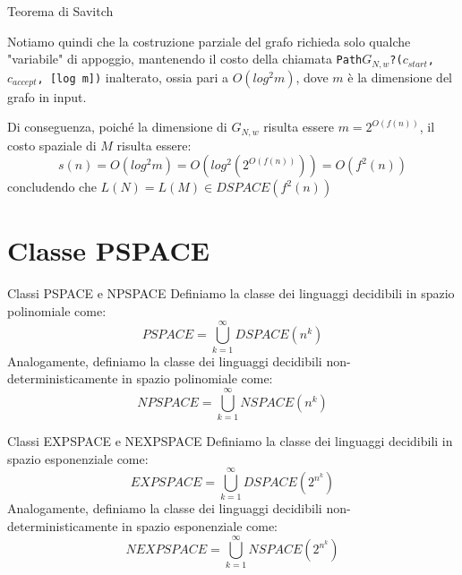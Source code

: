 \begin{Thm}{Teorema di Savitch}{}
\begin{demonstration}
Notiamo quindi che la costruzione parziale del grafo richieda solo qualche "variabile" di appoggio, mantenendo il costo della chiamata \texttt{Path$G_{N,w}$?($c_{start}$, $c_{accept}$, [log m])} inalterato, ossia pari a $O(log^2 m)$, dove $m$ è la dimensione del grafo in input.

Di conseguenza, poiché la dimensione di $G_{N,w}$ risulta essere $m = 2^{O(f(n))}$, il costo spaziale di $M$ risulta essere:
\begin{equation*}
    s(n) = O(log^2 m) = O(log^2(2^{O(f(n))})) = O(f^2(n))    
\end{equation*}
concludendo che $L(N) = L(M)\in DSPACE(f^2(n))$
\end{demonstration}
\end{Thm}

\section{Classe PSPACE}
\begin{Definition}{Classi PSPACE e NPSPACE}{}
Definiamo la classe dei linguaggi decidibili in spazio polinomiale come:
\begin{equation*}
    PSPACE = \bigcup_{k=1}^\infty DSPACE(n^k)
\end{equation*}
Analogamente, definiamo la classe dei linguaggi decidibili non-deterministicamente in spazio polinomiale come:
\begin{equation*}
    NPSPACE = \bigcup_{k=1}^\infty NSPACE(n^k)
\end{equation*}
\end{Definition}

\begin{Definition}{Classi EXPSPACE e NEXPSPACE}{}
Definiamo la classe dei linguaggi decidibili in spazio esponenziale come:
\begin{equation*}
    EXPSPACE = \bigcup_{k=1}^\infty DSPACE(2^{n^k})
\end{equation*}
Analogamente, definiamo la classe dei linguaggi decidibili non-deterministicamente in spazio esponenziale come:
\begin{equation*}
    NEXPSPACE = \bigcup_{k=1}^\infty NSPACE(2^{n^k})
\end{equation*}    
\end{Definition}

